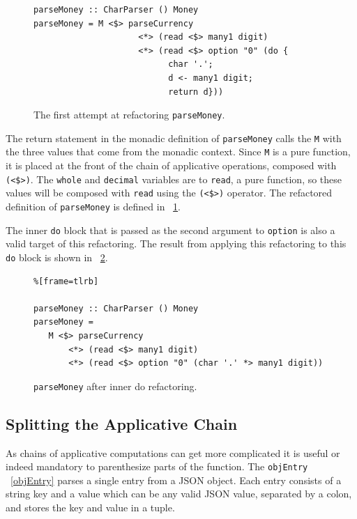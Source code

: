 \begin{figure}[t]
\begin{lstlisting}
parseMoney :: CharParser () Money
parseMoney = M <$> parseCurrency 
		             <*> (read <$> many1 digit) 
		             <*> (read <$> option "0" (do { 
                           char '.';
                           d <- many1 digit;
                           return d}))
\end{lstlisting}
\caption{The first attempt at refactoring \texttt{parseMoney}.}
\label{parseMon_ref1}
\end{figure}


The return statement in the monadic definition of \texttt{parseMoney} calls the \DIFdelbegin {}\DIFdelend \DIFaddbegin {}\DIFaddend \texttt{M} with the three values that come from the monadic context. Since \texttt{M} is a pure function, it is placed at the front of the chain of applicative operations, composed with \texttt{(<\$>)}. The \texttt{whole} and \texttt{decimal} variables are \DIFdelbegin {}\DIFdelend \DIFaddbegin {}\DIFaddend to \texttt{read}, a pure function, so these values will be composed with \texttt{read} using the \texttt{(<\$>)} operator. The refactored definition of \texttt{parseMoney} is defined in \DIFdelbegin {}\DIFdelend \DIFaddbegin {}\DIFaddend ~\ref{parseMon_ref1}.

The inner \texttt{do} block that is passed as the second argument to \texttt{option} is also a valid target of this refactoring. The result from applying this refactoring to this \texttt{do} block is shown in \DIFdelbegin {}\DIFdelend \DIFaddbegin {}\DIFaddend ~\ref{parseMon_ref2}.

\begin{figure}[t]
 \begin{lstlisting}%[frame=tlrb]

parseMoney :: CharParser () Money
parseMoney = 
   M <$> parseCurrency 
	   <*> (read <$> many1 digit) 
	   <*> (read <$> option "0" (char '.' *> many1 digit))
\end{lstlisting}
\caption{\texttt{parseMoney} after inner do refactoring.}
\label{parseMon_ref2}
\end{figure}

\subsection{Splitting the Applicative Chain}
As chains of applicative computations can get more complicated it is useful or indeed mandatory to parenthesize parts of the function. The \texttt{objEntry} \DIFdelbegin {}\DIFdelend \DIFaddbegin {}\DIFaddend ~\ref{objEntry} parses a single entry from a JSON object. Each entry consists of a string key and a value which can be any valid JSON value, separated by a colon, and stores the key and value in a tuple. 

